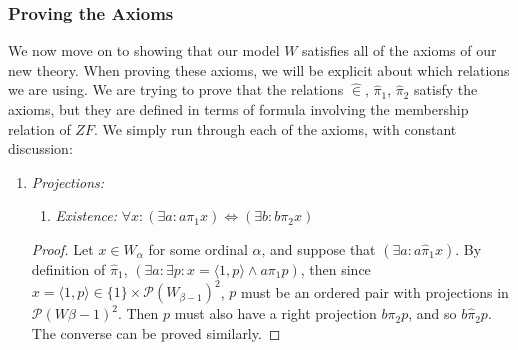\documentclass[11pt]{report}
\newcommand{\pleft}{\mathrel{\pi_1}}
\newcommand{\pright}{\mathrel{\pi_2}}
\newcommand{\pair}[2]{\langle #1,#2 \rangle}
\newcommand{\zin}{\mathrel{\widehat{\in}}}
\newcommand{\zpright}{\mathrel{\widehat{\pi}_2}}
\newcommand{\zpleft}{\mathrel{\widehat{\pi}_1}}
\theoremstyle{definition}
\theoremstyle{theorem}
\theoremstyle{lemma}
\begin{document}
\subsubsection{Proving the Axioms}
We now move on to showing that our model $W$ satisfies all of the axioms of our new theory. When proving these axioms, we will be explicit about which relations we are using. We are trying to prove that the relations $\zin$, $\zpleft$, $\zpright$ satisfy the axioms, but they are defined in terms of formula involving the membership relation of $\mathit{ZF}$. We simply run through each of the axioms, with constant discussion:

\begin{enumerate}[series=axiomlist, label=\Roman*.]
  \item \textit{Projections:}
        \begin{enumerate}[series=sublist, label=(\roman*)]
        \item \textit{Existence:} $\forall x: (\exists a: a\pleft x) \Leftrightarrow (\exists b: b\pright x)$
        \end{enumerate}
        \begin{proof}
        Let $x\in W_\alpha$ for some ordinal $\alpha$, and suppose that $(\exists a: a\zpleft x)$.
        By definition of $\zpleft$, $(\exists a: \exists p: x = \pair{1}{p} \wedge a \pleft p)$, then since $x = \pair{1}{p}\in \{1\}\times\mathcal{P}(W_{\beta-1})^2$, $p$ must be an ordered pair with projections in $\mathcal{P}(W\beta-1)^2$. 
        Then $p$ must also have a right projection $b \pright p$, and so $b\zpright p$.
        The converse can be proved similarly.
      \end{proof}
\end{enumerate}
\end{document}
